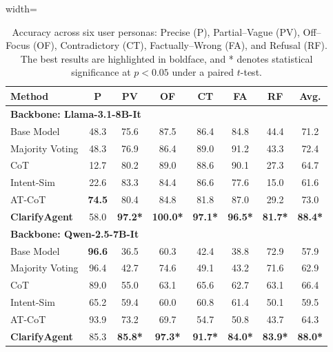 \documentclass[sigconf]{acmart}
\newcommand{\model}{ClarifyAgent\xspace}
\begin{document}
\begin{table}[!t]
\centering
\caption{Accuracy across six user personas: Precise (P), Partial--Vague (PV), 
Off--Focus (OF), Contradictory (CT), Factually--Wrong (FA), and Refusal (RF). The best results are highlighted in boldface, and * denotes statistical significance at $p < 0.05$ under a paired $t$-test.}
\label{tab:clarifyagent}
\begin{adjustbox}{width=\linewidth}
\begin{tabular}{lccccccc}
\toprule
\textbf{Method} & \textbf{P} & \textbf{PV} & \textbf{OF} & \textbf{CT} & \textbf{FA} & \textbf{RF} & \textbf{Avg.} \\
\midrule

\multicolumn{8}{l}{\textbf{Backbone: Llama-3.1-8B-It}} \\
Base Model        & 48.3 & 75.6 & 87.5 & 86.4 & 84.8 & 44.4 & 71.2 \\
Majority Voting   & 48.3 & 76.9 & 86.4 & 89.0 & 91.2 & 43.3 & 72.4 \\
CoT               & 12.7 & 80.2 & 89.0 & 88.6 & 90.1 & 27.3 & 64.7 \\
Intent-Sim        & 22.6 & 83.3 & 84.4 & 86.6 & 77.6 & 15.0 & 61.6 \\
AT-CoT            & \textbf{74.5} & 80.4 & 84.8 & 81.8 & 87.0 & 29.2 & 73.0 \\
\rowcolor{gray!18} \textbf{\model}      & 58.0 & \textbf{97.2*} & \textbf{100.0*} & \textbf{97.1*} & \textbf{96.5*} & \textbf{81.7*} & \textbf{88.4*} \\

\midrule

\multicolumn{8}{l}{\textbf{Backbone: Qwen-2.5-7B-It}} \\
Base Model        & \textbf{96.6} & 36.5 & 60.3 & 42.4 & 38.8 & 72.9 & 57.9 \\
Majority Voting   & 96.4 & 42.7 & 74.6 & 49.1 & 43.2 & 71.6 & 62.9 \\
CoT               & 89.0 & 55.0 & 63.1 & 65.6 & 62.7 & 63.1 & 66.4 \\
Intent-Sim        & 65.2 & 59.4 & 60.0 & 60.8 & 61.4 & 50.1 & 59.5 \\
AT-CoT            & 93.9 & 73.2 & 69.7 & 54.7 & 50.8 & 43.7 & 64.3 \\
\rowcolor{gray!18} \textbf{\model}            & 85.3 & \textbf{85.8*} & \textbf{97.3*} & \textbf{91.7*} & \textbf{84.0*} & \textbf{83.9*} & \textbf{88.0*} \\

\bottomrule
\end{tabular}
\end{adjustbox}
\end{table}
\end{document}
